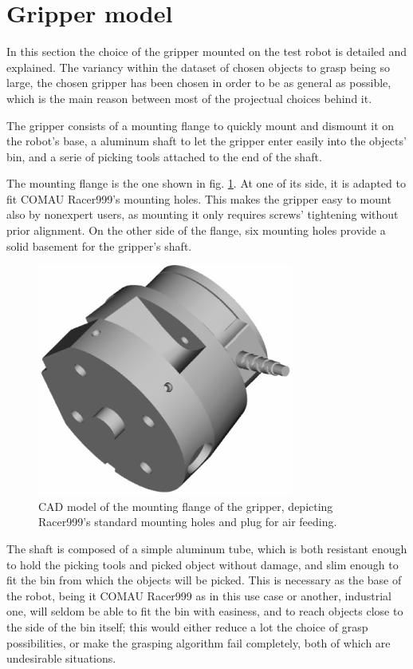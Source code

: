 \section{Gripper model}
In this section the choice of the gripper mounted on the test robot is detailed
and explained. The variancy within the dataset of chosen objects to grasp being
so large, the chosen gripper has been chosen in order to be as general as
possible, which is the main reason between most of the projectual choices behind
it.

The gripper consists of a mounting flange to quickly mount and
dismount it on the robot's base, a aluminum shaft to let the gripper enter
easily into the objects' bin, and a serie of picking tools attached to the end
of the shaft.

The mounting flange is the one shown in fig. \ref{fig:mounting-flange}. At one
of its side, it is adapted to fit COMAU Racer999's mounting holes. This makes
the gripper easy to mount also by nonexpert users, as mounting it only requires
screws' tightening without prior alignment. On the other side of the flange,
six mounting holes provide a solid basement for the gripper's shaft. 

\begin{figure}[htbp]
  \centering
  \includegraphics[height=3in]{./Graphics/gripper_flange}
  \caption{CAD model of the mounting flange of the gripper, depicting
  Racer999's standard mounting holes and plug for air feeding. \label{fig:mounting-flange}}
\end{figure}

The shaft is composed of a simple aluminum tube, which is both resistant enough
to hold the picking tools and picked object without damage, and slim enough to
fit the bin from which the objects will be picked. This is necessary as the
base of the robot, being it COMAU Racer999 as in this use case or another,
industrial one, will seldom be able to fit the bin with easiness, and to reach
objects close to the side of the bin itself; this would either reduce a lot the
choice of grasp possibilities, or make the grasping algorithm fail completely,
both of which are undesirable situations.

